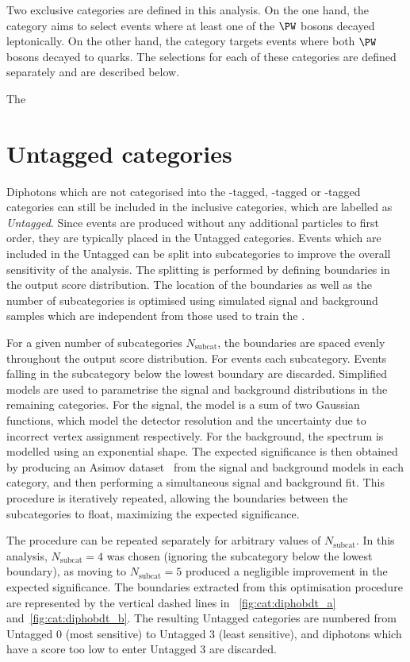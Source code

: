 Two \TTHTag exclusive categories are defined in this analysis. On the one hand, the \TTHLeptonicTag category aims to select \ttH events where at least one of the $\PW$ bosons decayed leptonically. On the other hand, the \TTHHadronicTag category targets events where both $\PW$ bosons decayed to quarks. The selections for each of these categories are defined separately and are described below.

The \TTHLeptonicTag 


\section{Untagged categories}
\label{cat:sec:untagged}

Diphotons which are not categorised into the \VBF-tagged, \VH-tagged or \ttH-tagged categories can still be included in the inclusive categories, which are labelled as \emph{Untagged}. Since \ggH events are produced without any additional particles to first order, they are typically placed in the Untagged categories. Events which are included in the Untagged can be split into subcategories to improve the overall sensitivity of the analysis. The splitting is performed by defining boundaries in the \DiPhoBdt output score distribution. The location of the boundaries as well as the number of subcategories is optimised using simulated signal and background samples which are independent from those used to train the \DiPhoBdt.

For a given number of subcategories $N_\text{subcat}$, the boundaries are spaced evenly throughout the \DiPhoBdt output score distribution.  For events each subcategory. Events falling in the subcategory below the lowest boundary are discarded.  Simplified models are used to parametrise the signal and background \mgg distributions in the remaining categories. For the signal, the model is a sum of two Gaussian functions, which model the detector resolution and the uncertainty due to incorrect vertex assignment respectively. For the background, the \mgg spectrum is modelled using an exponential shape. The expected significance is then obtained by producing an Asimov dataset~\cite{Cowan:2010js} from the signal and background models in each category, and then performing a simultaneous signal and background fit. This procedure is iteratively repeated, allowing the boundaries between the subcategories to float, maximizing the expected significance.

The procedure can be repeated separately for arbitrary values of $N_\text{subcat}$. In this analysis, $N_\text{subcat}=4$ was chosen (ignoring the subcategory below the lowest boundary), as moving to $N_\text{subcat}=5$ produced a negligible improvement in the expected significance. The boundaries extracted from this optimisation procedure are represented by the vertical dashed lines in \Fig\s~\ref{fig:cat:diphobdt_a} and~\ref{fig:cat:diphobdt_b}. The resulting Untagged categories are numbered from Untagged 0 (most sensitive) to Untagged 3 (least sensitive), and diphotons which have a \DiPhoBdt score too low to enter Untagged 3 are discarded.


